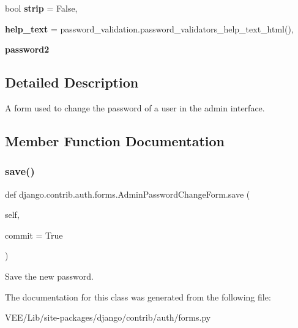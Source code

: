 \begin{DoxyCompactItemize}
\item 
\mbox{\label{classdjango_1_1contrib_1_1auth_1_1forms_1_1_admin_password_change_form_a22a6a37f6d623aba225e98f96f17b9b4}} 
bool {\bfseries strip} = False,
\item 
\mbox{\label{classdjango_1_1contrib_1_1auth_1_1forms_1_1_admin_password_change_form_a12a9c7da9de174a90cfde8d3fa67236a}} 
{\bfseries help\+\_\+text} = password\+\_\+validation.\+password\+\_\+validators\+\_\+help\+\_\+text\+\_\+html(),
\item 
\mbox{\label{classdjango_1_1contrib_1_1auth_1_1forms_1_1_admin_password_change_form_a23fe50e4f9fcac4b98b63e466d64e203}} 
{\bfseries password2}
\end{DoxyCompactItemize}


\subsection{Detailed Description}
\begin{DoxyVerb}A form used to change the password of a user in the admin interface.
\end{DoxyVerb}
 

\subsection{Member Function Documentation}
\mbox{\label{classdjango_1_1contrib_1_1auth_1_1forms_1_1_admin_password_change_form_a518d15d83bb09f0cd3e5ded33fd22852}} 
\subsubsection{\texorpdfstring{save()}{save()}}
{\footnotesize\ttfamily def django.\+contrib.\+auth.\+forms.\+Admin\+Password\+Change\+Form.\+save (\begin{DoxyParamCaption}\item[{}]{self,  }\item[{}]{commit = {\ttfamily True} }\end{DoxyParamCaption})}

\begin{DoxyVerb}Save the new password.\end{DoxyVerb}
 

The documentation for this class was generated from the following file\+:\begin{DoxyCompactItemize}
\item 
V\+E\+E/\+Lib/site-\/packages/django/contrib/auth/forms.\+py\end{DoxyCompactItemize}
